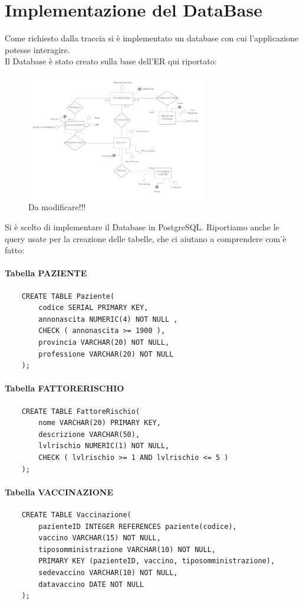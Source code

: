 \documentclass{article}
\begin{document}
\section{Implementazione del DataBase}
Come richiesto dalla traccia si è implementato un database con cui l'applicazione potesse interagire.\\
Il Database è stato creato sulla base dell'ER qui riportato:
\begin{figure}[h]
    \centering
    \includegraphics[width=0.7\textwidth]{pictures/_Diagramma vuoto.png}
    \caption{Da modificare!!!}
\end{figure}
Si è scelto di implementare il Database in PostgreSQL. Riportiamo anche le query usate per la creazione delle tabelle, che ci aiutano a comprendere com'è fatto:
\paragraph*{Tabella PAZIENTE}
\begin{verbatim}
    CREATE TABLE Paziente(
        codice SERIAL PRIMARY KEY,
        annonascita NUMERIC(4) NOT NULL ,
        CHECK ( annonascita >= 1900 ),
        provincia VARCHAR(20) NOT NULL,
        professione VARCHAR(20) NOT NULL
    );
\end{verbatim}
\paragraph*{Tabella FATTORERISCHIO}
\begin{verbatim}
    CREATE TABLE FattoreRischio(
        nome VARCHAR(20) PRIMARY KEY,
        descrizione VARCHAR(50),
        lvlrischio NUMERIC(1) NOT NULL,
        CHECK ( lvlrischio >= 1 AND lvlrischio <= 5 )
    );
\end{verbatim}
\paragraph*{Tabella VACCINAZIONE}
\begin{verbatim}
    CREATE TABLE Vaccinazione(
        pazienteID INTEGER REFERENCES paziente(codice),
        vaccino VARCHAR(15) NOT NULL,
        tiposomministrazione VARCHAR(10) NOT NULL,
        PRIMARY KEY (pazienteID, vaccino, tiposomministrazione),
        sedevaccino VARCHAR(10) NOT NULL,
        datavaccino DATE NOT NULL
    );
\end{verbatim}
\end{document}

